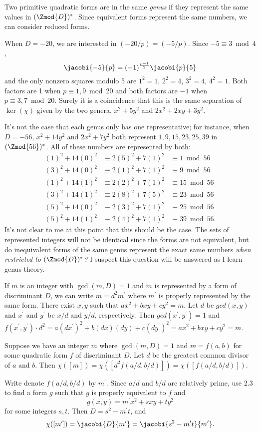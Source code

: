 Two primitive quadratic forms are in the same \emph{genus} if they represent the same values in $(\Zmod{D})^*$. Since equivalent forms represent the same numbers, we can consider reduced forms.

When $D=-20$, we are interested in $(-20/p) = (-5/p)$. Since $-5\equiv 3\bmod 4$,
\[\jacobi{-5}{p}=(-1)^\frac{p-1}{2}\jacobi{p}{5}\]
and the only nonzero squares modulo 5 are $1^2=1$, $2^2=4$, $3^2=4$, $4^2=1$. Both factors are 1 when $p\equiv 1, 9\bmod 20$ and both factors are $-1$ when $p\equiv 3, 7\bmod 20$. Surely it is a coincidence that this is the same separation of $\ker(\chi)$ given by the two genera, $x^2+5y^2$ and $2x^2+2xy+3y^2$.

It's not the case that each genus only has one representative; for instance, when $D=-56$, $x^2+14y^2$ and $2x^2+7y^2$ both represent $1, 9, 15, 23, 25, 39$ in $(\Zmod{56})^*$. All of these numbers are represented by both:
\begin{align*}
(1)^2 + 14(0)^2 &\equiv 2(5)^2+7(1)^2 &\equiv 1\bmod 56\\
(3)^2 + 14(0)^2 &\equiv 2(1)^2+7(1)^2 &\equiv 9\bmod 56\\
(1)^2 + 14(1)^2 &\equiv 2(2)^2+7(1)^2 &\equiv 15\bmod 56\\
(3)^2 + 14(1)^2 &\equiv 2(8)^2+7(5)^2 &\equiv 23\bmod 56\\
(5)^2 + 14(0)^2 &\equiv 2(3)^2+7(1)^2 &\equiv 25\bmod 56\\
(5)^2 + 14(1)^2 &\equiv 2(4)^2+7(1)^2 &\equiv 39\bmod 56.
\end{align*}
It's not clear to me at this point that this should be the case. The sets of represented integers will not be identical since the forms are not equivalent, but do inequivalent forms of the same genus represent the exact same numbers \emph{when restricted to $(\Zmod{D})^*$?} I suspect this question will be answered as I learn genus theory.

If $m$ is an integer with $\gcd(m, D)=1$ and $m$ is represented by a form of discriminant $D$, we can write $m=d^2m^\prime$ where $m^\prime$ is properly represented by the same form. There exist $x,y$ such that $ax^2+bxy+cy^2=m$. Let $d$ be $gcd(x,y)$ and $x^\prime$ and $y^\prime$ be $x/d$ and $y/d$, respectively. Then $gcd(x^\prime,y^\prime)=1$ and $f(x^\prime,y^\prime)\cdot d^2= a(dx^\prime)^2+b(dx)(dy)+c(dy^\prime)^2= ax^2 + bxy+cy^2=m$.

Suppose we have an integer $m$ where $\gcd(m,D)=1$ and $m=f(a,b)$ for some quadratic form $f$ of discriminant $D$. Let $d$ be the greatest common divisor of $a$ and $b$. Then $\chi([m])=\chi([d^2f(a/d, b/d)])=\chi([f(a/d, b/d)]).$

Write denote $f(a/d, b/d)$ by $m^\prime$. Since $a/d$ and $b/d$ are relatively prime, use 2.3 to find a form $g$ such that $g$ is properly equivalent to $f$ and
\[g(x,y)=m^\prime x^2+sxy+ty^2\]
for some integers $s,t$. Then $D=s^2-m^\prime t$, and
\[\chi([m^\prime])=\jacobi{D}{m^\prime}=\jacobi{s^2-m^\prime t}{m^\prime}.\]
